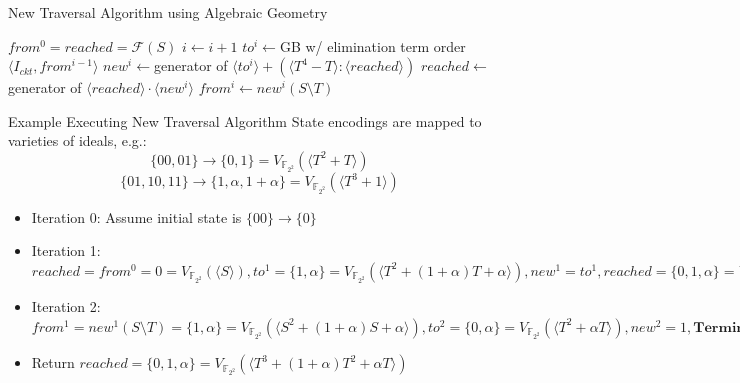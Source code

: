 \documentclass[xcolor=dvipsnames]{beamer}
\begin{document}
\begin{frame}{\large{New Traversal Algorithm using Algebraic Geometry}}

\begin{algorithm}[H]
\SetAlgoNoLine

  $from^0 = reached = \mathcal F(S)$\;
  {
  	$i \gets i + 1$\;
	$to^i \gets$GB w/ elimination term order$\langle I_{ckt}, from^{i-1}\rangle$\;
	$new^i \gets $generator of $\langle to^i\rangle + (\langle T^4-T\rangle:\langle reached\rangle)$\;
  	$reached \gets $generator of $\langle reached\rangle \cdot \langle new^i\rangle$\;
	$from^i \gets new^i(S\setminus T)$\;
  }
\caption {Algebraic Geometry based Traversal Algorithm}\label{alg:modified}
\end{algorithm}
\end{frame}

\begin{frame}{\large{Example Executing New Traversal Algorithm}}
State encodings are mapped to varieties of ideals, e.g.:
$$\{00,01\} \to \{0,1\} = V_{\mathbb F_{2^2}}(\langle T^2 + T\rangle)$$
$$\{01,10,11\} \to \{1,\alpha, 1+\alpha\} = V_{\mathbb F_{2^2}}(\langle T^3 + 1\rangle)$$
\begin{itemize}
\item Iteration 0: Assume initial state is $\{00\} \to \{0\}$
\item Iteration 1: $reached = from^0 = 0 = V_{\mathbb F_{2^2}}(\langle S\rangle), to^1 = \{1,\alpha\} = V_{\mathbb F_{2^2}}(\langle T^2+(1+\alpha)T+\alpha\rangle), 
new^1 = to^1, reached = \{0,1,\alpha\} = V_{\mathbb F_{2^2}}(\langle T^3+(1+\alpha)T^2+\alpha T\rangle)$
\item Iteration 2: $from^1 = new^1(S\setminus T) = \{1,\alpha\} = V_{\mathbb F_{2^2}}(\langle S^2+(1+\alpha)S+\alpha\rangle), to^2 = \{0,\alpha\}
= V_{\mathbb F_{2^2}}(\langle T^2+\alpha T\rangle),new^2 = 1, \textbf{Terminate}$
\item Return $reached = \{0,1,\alpha\} = V_{\mathbb F_{2^2}}(\langle T^3+(1+\alpha)T^2+\alpha T\rangle)$
\end{itemize}
\end{frame}
\end{document}
